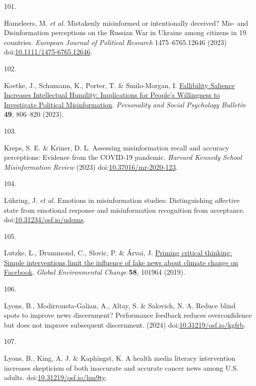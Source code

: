 \documentclass[
  doc,floatsintext]{apa6}
\newlength{\cslhangindent}
\newlength{\csllabelwidth}
\newenvironment{CSLReferences}[2] %
 {\begin{list}{}{%
  \setlength{\itemindent}{0pt}
  \setlength{\leftmargin}{0pt}
  \setlength{\parsep}{0pt}
  \ifodd #1
   \setlength{\leftmargin}{\cslhangindent}
   \setlength{\itemindent}{-1\cslhangindent}
  \fi
  \setlength{\itemsep}{#2\baselineskip}}}
 {\end{list}}
\newcommand{\CSLLeftMargin}[1]{\parbox[t]{\csllabelwidth}{\strut#1\strut}}
\newcommand{\CSLRightInline}[1]{\parbox[t]{\linewidth - \csllabelwidth}{\strut#1\strut}}
\begin{document}
\begin{CSLReferences}{0}{0}
\CSLLeftMargin{101. }%
\CSLRightInline{*Hameleers, M. \emph{et al.} Mistakenly misinformed or intentionally deceived? Mis{-} and Disinformation perceptions on the Russian War in Ukraine among citizens in 19 countries. \emph{European Journal of Political Research} 1475--6765.12646 (2023) doi:\href{https://doi.org/10.1111/1475-6765.12646}{10.1111/1475-6765.12646}.}

\CSLLeftMargin{102. }%
\CSLRightInline{*Koetke, J., Schumann, K., Porter, T. \& Smilo-Morgan, I. \href{https://doi.org/10.1177/01461672221080979}{Fallibility Salience Increases Intellectual Humility: Implications for People{'}s Willingness to Investigate Political Misinformation}. \emph{Personality and Social Psychology Bulletin} \textbf{49}, 806--820 (2023).}

\CSLLeftMargin{103. }%
\CSLRightInline{*Kreps, S. E. \& Kriner, D. L. Assessing misinformation recall and accuracy perceptions: Evidence from the COVID-19 pandemic. \emph{Harvard Kennedy School Misinformation Review} (2023) doi:\href{https://doi.org/10.37016/mr-2020-123}{10.37016/mr-2020-123}.}

\CSLLeftMargin{104. }%
\CSLRightInline{*Lühring, J. \emph{et al.} Emotions in misinformation studies: Distinguishing affective state from emotional response and misinformation recognition from acceptance. doi:\href{https://doi.org/10.31234/osf.io/udqms}{10.31234/osf.io/udqms}.}

\CSLLeftMargin{105. }%
\CSLRightInline{*Lutzke, L., Drummond, C., Slovic, P. \& Árvai, J. \href{https://doi.org/10.1016/j.gloenvcha.2019.101964}{Priming critical thinking: Simple interventions limit the influence of fake news about climate change on Facebook}. \emph{Global Environmental Change} \textbf{58}, 101964 (2019).}

\CSLLeftMargin{106. }%
\CSLRightInline{*Lyons, B., Modirrousta-Galian, A., Altay, S. \& Salovich, N. A. Reduce blind spots to improve news discernment? Performance feedback reduces overconfidence but does not improve subsequent discernment. (2024) doi:\href{https://doi.org/10.31219/osf.io/kgfrb}{10.31219/osf.io/kgfrb}.}

\CSLLeftMargin{107. }%
\CSLRightInline{*Lyons, B., King, A. J. \& Kaphingst, K. A health media literacy intervention increases skepticism of both inaccurate and accurate cancer news among U.S. adults. doi:\href{https://doi.org/10.31219/osf.io/hm9ty}{10.31219/osf.io/hm9ty}.}


\end{CSLReferences}
\end{document}

